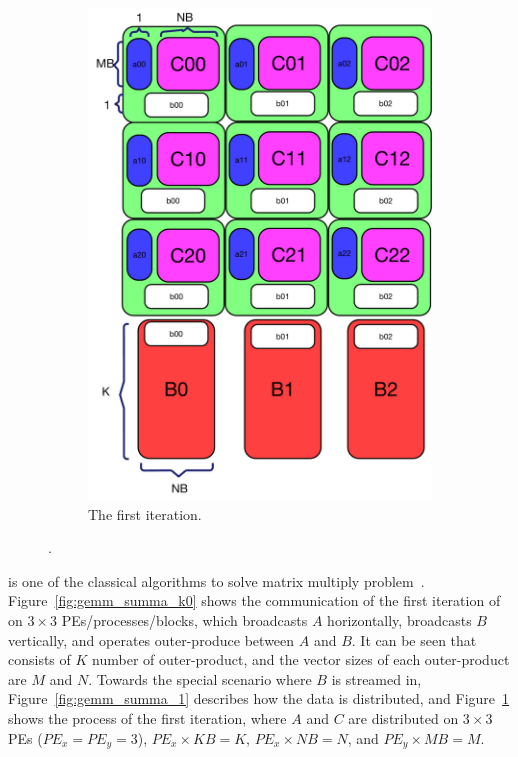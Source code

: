 \begin{figure}[b!]
\begin{subfigure}{0.40\columnwidth}
    \includegraphics[width=\linewidth]{figures/gemm_A_C_memory_summa/2.pdf}
    \caption{The first iteration.}
    \label{fig:gemm_summa_2}
  \end{subfigure}
  \caption{\summa.}
  \label{fig:gemm_summa_1_2}
\end{figure}

\summa is one of the classical algorithms to solve matrix multiply problem~\cite{van1997summa}.
%
Figure~\ref{fig:gemm_summa_k0} shows the communication of the first iteration of \summa on $3 \times 3$ PEs/processes/blocks, which broadcasts $A$ horizontally, broadcasts $B$ vertically, and operates outer-produce between $A$ and $B$.
%
It can be seen that \summa consists of $K$ number of outer-product, and the vector sizes of each outer-product are $M$ and $N$.
%
Towards the special scenario where $B$ is streamed in, Figure~\ref{fig:gemm_summa_1} describes how the data is distributed, and Figure~\ref{fig:gemm_summa_2} shows the process of the first iteration, where $A$ and $C$ are distributed on $3 \times 3$ PEs ($PE_x = PE_y = 3$), $PE_x \times KB = K$, $PE_x \times NB = N$, and $PE_y \times MB = M$.


